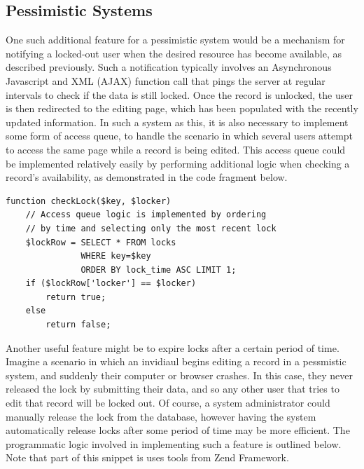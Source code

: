 \documentclass[12pt]{article}
\begin{document}
\subsection{Pessimistic Systems}
One such additional feature for a pessimistic system would be a mechanism for notifying a locked-out user when the desired resource has become available, as described previously. Such a notification typically involves an Asynchronous Javascript and XML (AJAX) function call that pings the server at regular intervals to check if the data is still locked. Once the record is unlocked, the user is then redirected to the editing page, which has been populated with the recently updated information. In such a system as this, it is also necessary to implement some form of access queue, to handle the scenario in which several users attempt to access the same page while a record is being edited. This access queue could be implemented relatively easily by performing additional logic when checking a record's availability, as demonstrated in the code fragment below.

\begin{framed}
\begin{spacing}{1.0}
\begin{verbatim}
function checkLock($key, $locker)
    // Access queue logic is implemented by ordering 
    // by time and selecting only the most recent lock
    $lockRow = SELECT * FROM locks
               WHERE key=$key
               ORDER BY lock_time ASC LIMIT 1;
    if ($lockRow['locker'] == $locker)
        return true;
    else
        return false;

\end{verbatim}
\end{spacing}
\end{framed}

Another useful feature might be to expire locks after a certain period of time. Imagine a scenario in which an invidiaul begins editing a record in a pessmistic system, and suddenly their computer or browser crashes. In this case, they never released the lock by submitting their data, and so any other user that tries to edit that record will be locked out. Of course, a system administrator could manually release the lock from the database, however having the system automatically release locks after some period of time may be more efficient. The programmatic logic involved in implementing such a feature is outlined below. Note that part of this snippet is uses tools from Zend Framework.

\newpage
\end{document}
